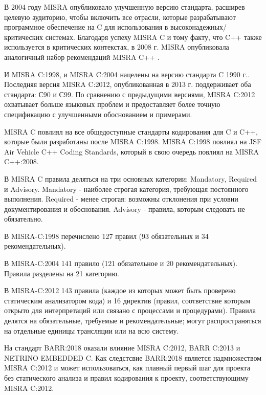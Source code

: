 В 2004 году MISRA опубликовало улучшенную версию стандарта\autocite{Misrac2004}, расширев целевую аудиторию, 
чтобы включить все отрасли, которые разрабатывают программное обеспечение на C для использования в 
высоконадежных/критических системах. Благодаря успеху MISRA C и тому факту, что C++ также используется в 
критических контекстах, в 2008 г. MISRA опубликовала аналогичный набор рекомендаций MISRA C++
\autocite{Misrac2008}.

И MISRA C:1998, и MISRA C:2004 нацелены на версию стандарта C 1990 г.\autocite{C-ISOIEC99899-1990}. Последняя 
версия MISRA C:2012, опубликованная в 2013 г.\autocite{Misrac2012} поддерживает оба стандарта: С90 и 
С99\autocite{C-ISOIEC99899-1999}. По сравнению с предыдущими версиями, MISRA C:2012 охватывает больше языковых 
проблем и предоставляет более точную спецификацию с улучшенными обоснованием и примерами.

MISRA C повлиял на все общедоступные стандарты кодирования для C и C++, которые были разработаны после MISRA 
C:1998. MISRA C:1998 повлиял на JSF Air Vehicle C++ Coding Standards\autocite{JSF}, который в свою очередь повлиял на MISRA C++:2008.

В MISRA C правила деляться на три основных категории: Mandatory, Required и Advisory. Mandatory -
наиболее строгая категория, требующая постоянного выполнения. Required - менее строгая: возможны 
отклонения при условии документирования и обоснования. Advisory - правила, которым следовать 
не обязательно.

В MISRA-C:1998 перечислено 127 правил (93 обязательных и 34 рекомендательных).

В MISRA-C:2004 141 правило (121 обязательное и 20 рекомендательных). Правила разделены на 21 категорию.

В MISRA-C:2012 143 правила (каждое из которых может быть проверено статическим анализатором кода) и 16 директив 
(правил, соответствие которым открыто для интерпретаций или связано с процессами и процедурами). Правила делятся 
на обязательные, требуемые и рекомендательные; могут распространяться на отдельные единицы трансляции или на всю 
систему.

На стандарт BARR:2018 оказали влияние MISRA C:2012, BARR C:2013 и NETRINO EMBEDDED C. Как следстсвие BARR:2018 является 
надмножеством MISRA C:2012 и может использоваться, как плавный первый шаг для проекта без статического анализа и правил кодирования 
к проекту, соответствующиму MISRA C:2012.

